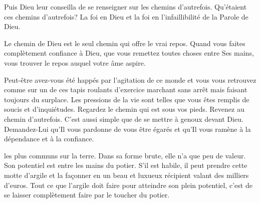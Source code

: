 Puis Dieu leur conseilla de
 \og se renseigner sur les chemins d'autrefois. \fg{}
 Qu'étaient ces chemins d'autrefois? La foi en Dieu et la foi
 en l'infaillibilité de la Parole de Dieu. 


Le chemin de Dieu est le seul chemin qui offre le vrai repos.
 Quand vous faites complètement confiance à Dieu,
 que vous remettez toutes choses entre Ses mains,
 vous trouver le repos auquel votre âme aspire. 

Peut-être avez-vous été happés par l'agitation de ce monde
 et vous vous retrouvez comme sur un de ces tapis roulants d'exercice
 \ocadr marchant sans arrêt mais faisant toujours du surplace.
 Les pressions de la vie sont telles que vous êtes remplis de soucis
 et d'inquiétudes. Regardez le chemin qui est sous vos pieds.
 Revenez au chemin d'autrefois. C'est aussi simple que de se mettre
 à genoux devant Dieu. Demandez-Lui qu'Il vous pardonne de vous
 être égarés et qu'Il vous ramène à la dépendance et à la confiance. 

\dvrule







 les plus communs sur la terre.
 Dans sa forme brute, elle n'a que peu de valeur.
 Son potentiel est entre les mains du potier.
 S'il est habile, il peut prendre cette motte d'argile et la façonner
 en un beau et luxueux récipient valant des milliers d'euros.
 Tout ce que l'argile doit faire pour atteindre son plein potentiel,
 c'est de se laisser complètement faire par le toucher du potier. 

